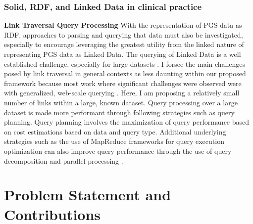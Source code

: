 \documentclass[runningheads]{llncs}
\begin{document}

\subsubsection{Solid, RDF, and Linked Data in clinical practice}




\textbf{Link Traversal Query Processing}
With the representation of PGS data as RDF, approaches to parsing and querying that data must also be investigated, especially to encourage leveraging the greatest utility from the linked nature of representing PGS data as Linked Data.
The querying of Linked Data is a well established challenge, especially for large datasets \cite{taelman_evaluation_2023}.
I forsee the main challenges posed by link traversal in general contexts as less daunting within our proposed framework because most work where significant challenges were observed were with generalized, web-scale querying \cite{taelman_evaluation_2023}. 
Here, I am proposing a relatively small number of links within a large, known dataset. 
Query processing over a large dataset is made more performant through following strategies such as query planning.
Query planning involves the maximization of query performance based on cost estimations based on data and query type. 
Additional underlying strategies such as the use of MapReduce frameworks for query execution optimization can also improve query performance through the use of query decomposition and parallel processing \cite{shim_mapreduce_2013}.  


\section{Problem Statement and Contributions}

\end{document}
